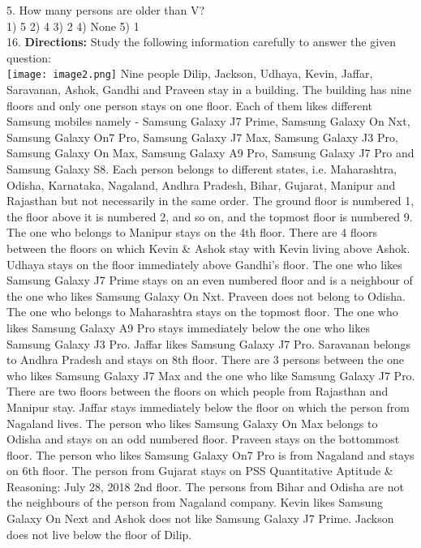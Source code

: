 \documentclass[
]{article}
\begin{document}
5. How many persons are older than V?\\
1) 5 \hspace{2mm}2) 4 \hspace{2mm}3) 2 \hspace{2mm}4) None \hspace{2mm}5) 1\\

16. \textbf{Directions:} Study the following information carefully to answer the given question:\\
\texttt{[image: image2.png]}
Nine people Dilip, Jackson, Udhaya, Kevin, Jaffar, Saravanan, Ashok, Gandhi and Praveen
stay in a building. The building has nine floors and only one person stays on one floor. Each
of them likes different Samsung mobiles namely - Samsung Galaxy J7 Prime, Samsung
Galaxy On Nxt, Samsung Galaxy On7 Pro, Samsung Galaxy J7 Max, Samsung Galaxy J3 Pro,
Samsung Galaxy On Max, Samsung Galaxy A9 Pro, Samsung Galaxy J7 Pro and Samsung
Galaxy S8. Each person belongs to different states, i.e. Maharashtra, Odisha, Karnataka,
Nagaland, Andhra Pradesh, Bihar, Gujarat, Manipur and Rajasthan but not necessarily in
the same order. The ground floor is numbered 1, the floor above it is numbered 2, and so on,
and the topmost floor is numbered 9. The one who belongs to Manipur stays on the 4th floor.
There are 4 floors between the floors on which Kevin \& Ashok stay with Kevin living above
Ashok. Udhaya stays on the floor immediately above Gandhi’s floor. The one who likes
Samsung Galaxy J7 Prime stays on an even numbered floor and is a neighbour of the one
who likes Samsung Galaxy On Nxt. Praveen does not belong to Odisha. The one who
belongs to Maharashtra stays on the topmost floor. The one who likes Samsung Galaxy A9
Pro stays immediately below the one who likes Samsung Galaxy J3 Pro. Jaffar likes Samsung
Galaxy J7 Pro. Saravanan belongs to Andhra Pradesh and stays on 8th floor. There are 3
persons between the one who likes Samsung Galaxy J7 Max and the one who like Samsung
Galaxy J7 Pro. There are two floors between the floors on which people from Rajasthan and
Manipur stay. Jaffar stays immediately below the floor on which the person from Nagaland
lives. The person who likes Samsung Galaxy On Max belongs to Odisha and stays on an
odd numbered floor. Praveen stays on the bottommost floor. The person who likes Samsung
Galaxy On7 Pro is from Nagaland and stays on 6th floor. The person from Gujarat stays on
PSS Quantitative Aptitude \& Reasoning: July 28, 2018 2nd floor. The persons from Bihar and
Odisha are not the neighbours of the person from Nagaland company. Kevin likes Samsung
Galaxy On Next and Ashok does not like Samsung Galaxy J7 Prime. Jackson does not live
below the floor of Dilip.\\
\end{document}
